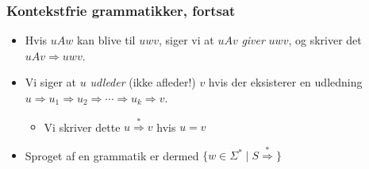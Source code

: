 \begin{frame}
  \frametitle{Kontekstfrie grammatikker, fortsat}

  \begin{itemize}
    \item Hvis $uAw$ kan blive til $uwv$, siger vi at $uAv$ \textit{giver} $uwv$, og skriver det $uAv \Rightarrow uwv$.
\item Vi siger at $u$ \textit{udleder} (ikke afleder!) $v$ hvis der eksisterer en udledning $u \Rightarrow u_{1} \Rightarrow u_{2} \Rightarrow \cdots \Rightarrow u_{k} \Rightarrow v$.
          \begin{itemize}
            \item Vi skriver dette $u \overset{*}{\Rightarrow} v$ hvis $u = v$
          \end{itemize}
    \item Sproget af en grammatik er dermed $\{w \in \Sigma^{*} \mid S \overset{*}{\Rightarrow}\}$
  \end{itemize}
\end{frame}

